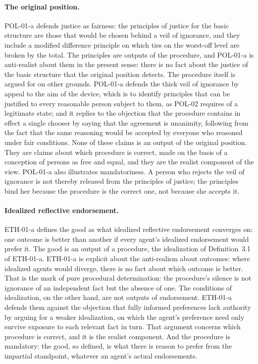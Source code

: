 \documentclass{situationist-preprint}
\begin{document}
\paragraph{The original position.} POL-01-a defends justice as fairness: the principles of justice for the basic structure are those that would be chosen behind a veil of ignorance, and they include a modified difference principle on which ties on the worst-off level are broken by the total. The principles are outputs of the procedure, and POL-01-a is anti-realist about them in the present sense: there is no fact about the justice of the basic structure that the original position detects. The procedure itself is argued for on other grounds. POL-01-a defends the thick veil of ignorance by appeal to the aim of the device, which is to identify principles that can be justified to every reasonable person subject to them, as POL-02 requires of a legitimate state; and it replies to the objection that the procedure contains in effect a single chooser by saying that the agreement is unanimity, following from the fact that the same reasoning would be accepted by everyone who reasoned under fair conditions. None of these claims is an output of the original position. They are claims about which procedure is correct, made on the basis of a conception of persons as free and equal, and they are the realist component of the view. POL-01-a also illustrates mandatoriness. A person who rejects the veil of ignorance is not thereby released from the principles of justice; the principles bind her because the procedure is the correct one, not because she accepts it.

\paragraph{Idealized reflective endorsement.} ETH-01-a defines the good as what idealized reflective endorsement converges on: one outcome is better than another if every agent's idealized endorsement would prefer it. The good is an output of a procedure, the idealization of Definition~3.1 of ETH-01-a. ETH-01-a is explicit about the anti-realism about outcomes: where idealized agents would diverge, there is no fact about which outcome is better. That is the mark of pure procedural determination: the procedure's silence is not ignorance of an independent fact but the absence of one. The conditions of idealization, on the other hand, are not outputs of endorsement. ETH-01-a defends them against the objection that fully informed preferences lack authority by arguing for a weaker idealization, on which the agent's preference need only survive exposure to each relevant fact in turn. That argument concerns which procedure is correct, and it is the realist component. And the procedure is mandatory: the good, so defined, is what there is reason to prefer from the impartial standpoint, whatever an agent's actual endorsements.
\end{document}
